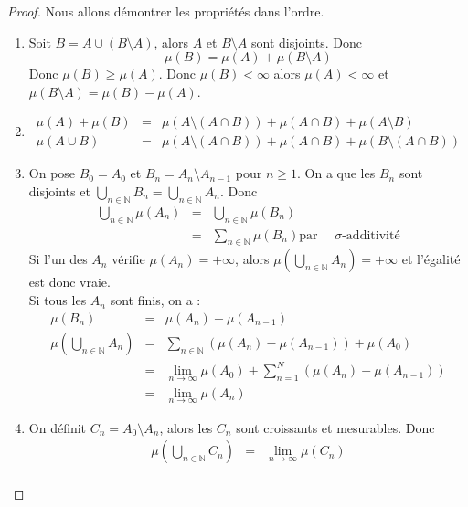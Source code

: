 \documentclass{article}
\theoremstyle{definition}
\theoremstyle{definition}
\theoremstyle{definition}
\theoremstyle{definition}
\theoremstyle{plain}
\theoremstyle{definition}
\begin{document}
\begin{proof}
	Nous allons démontrer les propriétés dans l'ordre.
	\begin{enumerate}
		\item Soit $B = A \cup (B \setminus A)$, alors $A$ et $B \setminus A$ sont disjoints. Donc
		      \[\mu(B) = \mu(A) + \mu(B \setminus A)\]
		      Donc $\mu(B) \geq \mu(A)$. Donc $\mu(B) < \infty$ alors $\mu(A)< \infty$ et $\mu(B \setminus A) = \mu(B) - \mu(A)$.
		\item \begin{eqnarray*}
			      \mu(A) + \mu (B) &=& \mu( A \setminus (A \cap B)) + \mu(A \cap B) + \mu(A \setminus B) \\
			      \mu(A\cup B)&=& \mu(A \setminus (A \cap B)) + \mu(A \cap B) + \mu(B \setminus (A \cap B))
		      \end{eqnarray*}
		\item On pose $B_0 = A_0$ et $B_n = A_n \setminus A_{n-1}$ pour $n \geq 1$. On a que les $B_n$ sont disjoints et
		      $\bigcup\limits_{n \in \mathbb{N}} B_n = \bigcup\limits_{n \in \mathbb{N}} A_n$. Donc
		      \begin{eqnarray*}
			      \bigcup\limits_{n \in \mathbb{N}} \mu(A_n) &=& \bigcup\limits_{n \in \mathbb{N}} \mu(B_n) \\
			      &=& \sum\limits_{n \in \mathbb{N}} \mu(B_n) \text{par }\quad \sigma\text{-additivité}
		      \end{eqnarray*}
		      Si l'un des $A_n$ vérifie $\mu(A_n) = +\infty$, alors $\mu(\bigcup\limits_{n \in \mathbb{N}} A_n) = +\infty$
		      et l'égalité est donc vraie.
		      \\
		      Si tous les $A_n$ sont finis, on a :
		      \begin{eqnarray*}
			      \mu(B_n) &=& \mu(A_n) - \mu(A_{n-1}) \\
			      \mu(\bigcup\limits_{n \in \mathbb{N}} A_n) &=& \sum\limits_{n \in \mathbb{N}} \left( \mu(A_n) - \mu(A_{n-1}) \right)+ \mu(A_0) \\
			      &=& \lim\limits_{n \to \infty} \mu(A_0) + \sum\limits_{n = 1}^N \left( \mu(A_n) - \mu(A_{n-1}) \right) \\
			      &=& \lim\limits_{n \to \infty} \mu(A_n)
		      \end{eqnarray*}
		\item On définit $C_n = A_0 \setminus A_n $, alors les $C_n$ sont croissants et mesurables. Donc
		      \begin{eqnarray*}
			      \mu(\bigcup\limits_{n \in \mathbb{N}} C_n) &=& \lim\limits_{n \to \infty} \mu(C_n) \\

\end{eqnarray*}
\end{enumerate}
\end{proof}
\end{document}
